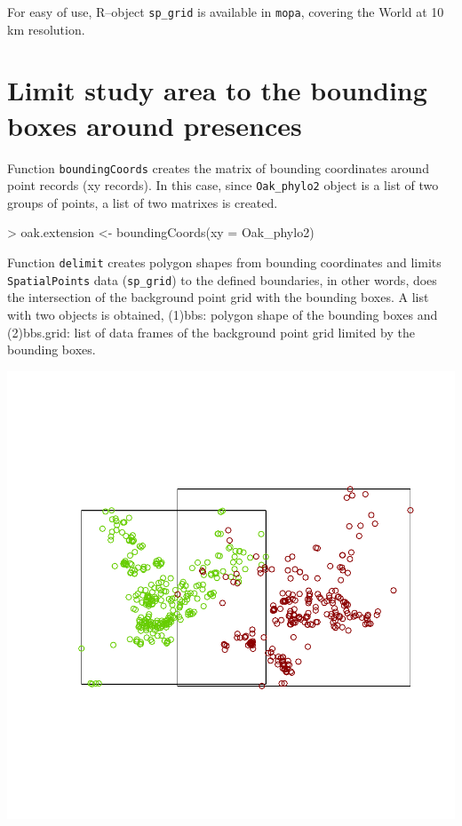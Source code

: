 \documentclass[10pt,a4paper]{report}
\begin{document}
For easy of use, R--object \texttt{sp\_grid} is available in \texttt{mopa}, covering the World at 10 km resolution.

\section{Limit study area to the bounding boxes around presences}

Function \texttt{boundingCoords} creates the matrix of bounding coordinates around point records (xy records). In this case, since \texttt{Oak\_phylo2} object is a list of two groups of points, a list of two matrixes is created.

\begin{Schunk}
\begin{Sinput}
>  oak.extension <- boundingCoords(xy = Oak_phylo2)
\end{Sinput}
\end{Schunk}

Function \texttt{delimit} creates polygon shapes from bounding coordinates and limits \texttt{SpatialPoints} data (\texttt{sp\_grid}) to the defined boundaries, in other words, does the intersection of the background point grid with the bounding boxes. A list with two objects is obtained, (1)bbs: polygon shape of the bounding boxes and (2)bbs.grid: list of data frames of the background point grid limited by the bounding boxes.


\begin{Schunk}
\end{Schunk}
\includegraphics{mopa-mopa6}
\end{document}
